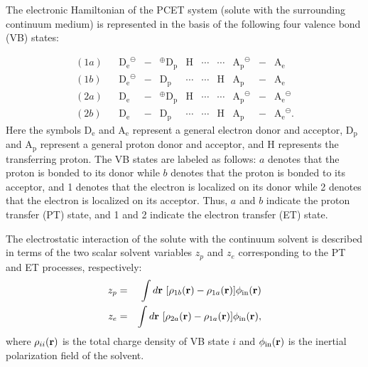 \documentclass[oneside,11pt,openany]{book}
\begin{document}
The electronic Hamiltonian of the PCET system (solute with
the surrounding continuum medium) is represented in the basis
of the following four valence bond (VB) states:

\begin{equation}
\begin{array}{lllcrlcrlcl}
(1a)&&\mbox{D$_{{\mathrm e}}$}^\ominus&-&^\oplus\mbox{D$_{{\mathrm p}}$}&\mbox{H}&\cdots
&\cdots&\mbox{A$_{{\mathrm p}}$}^\ominus&-&\mbox{A$_{{\mathrm e}}$} \\
(1b)&&\mbox{D$_{{\mathrm e}}$}^\ominus&-&\mbox{D$_{{\mathrm p}}$}&\cdots
&\cdots&\mbox{H}&\mbox{A$_{{\mathrm p}}$}
&-&\mbox{A$_{{\mathrm e}}$} \\
(2a)&&\mbox{D$_{{\mathrm e}}$}&-&^\oplus\mbox{D$_{{\mathrm p}}$}&\mbox{H}
&\cdots&\cdots&\mbox{A$_{{\mathrm p}}$}^\ominus&-&\mbox{A$_{{\mathrm e}}$}^\ominus \\
(2b)&&\mbox{D$_{{\mathrm e}}$}&-&\mbox{D$_{{\mathrm p}}$}&\cdots&\cdots&
\mbox{H}&\mbox{A$_{{\mathrm p}}$}&-&\mbox{A$_{{\mathrm e}}$}^\ominus.
\end{array}
\label{eq.definepcetvb}
\end{equation}
%
Here the symbols D$_{\mathrm e}$ and A$_{\mathrm e}$ represent
a general electron donor and acceptor,
D$_{\mathrm p}$ and A$_{\mathrm p}$ represent
a general proton donor and acceptor, and H represents the transferring
proton. The VB states are labeled as follows:
$a$ denotes that the proton is bonded to its donor while
$b$ denotes that the proton is
bonded to its acceptor, and
1 denotes that the electron is localized on its donor while
2 denotes that the electron is localized on its acceptor.
Thus, $a$ and $b$ indicate the proton transfer (PT) state, and
1 and 2 indicate the electron transfer (ET) state.

The electrostatic interaction of the solute with the continuum
solvent is described in terms of the two scalar solvent variables
$z_p$ and $z_e$ corresponding to the PT and ET processes,
respectively:
\begin{eqnarray}
z_p &=& \int d{\bf r}\,\,[\rho_{1b}({\bf r})-\rho_{1a}({\bf r})]
\phi_{\mathrm{in}}({\bf r}) \nonumber \\
z_e &=& \int d{\bf r}\,\,[\rho_{2a}({\bf r})-\rho_{1a}({\bf r})]
\phi_{\mathrm{in}}({\bf r}),
\end{eqnarray}
where $\rho_{ii}({\bf r})$ is the total charge density
of VB state $i$ and $\phi_{\mathrm{in}}({\bf r})$ is the inertial
polarization field of the solvent.
\end{document}
